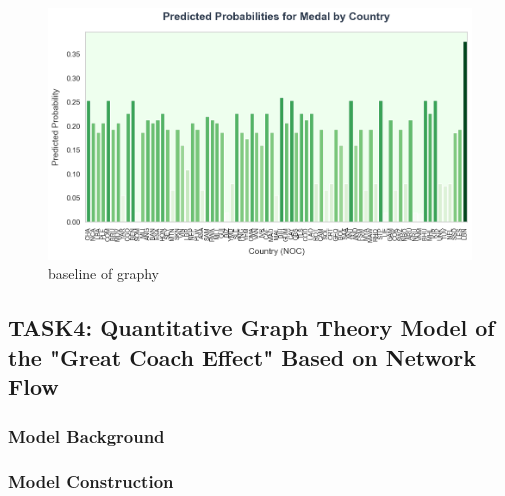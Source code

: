 \documentclass{mcmthesis}
\begin{document}
\begin{figure}[h]   
    \centering          
    \includegraphics[width=12cm]{graph/rf_prediction.png}
    \caption{baseline of graphy} \label{fig1}    
\end{figure}

\subsection{TASK4: Quantitative Graph Theory Model of the "Great Coach Effect" Based on Network Flow}

\subsubsection{Model Background}

\subsubsection{Model Construction}

\end{document}

